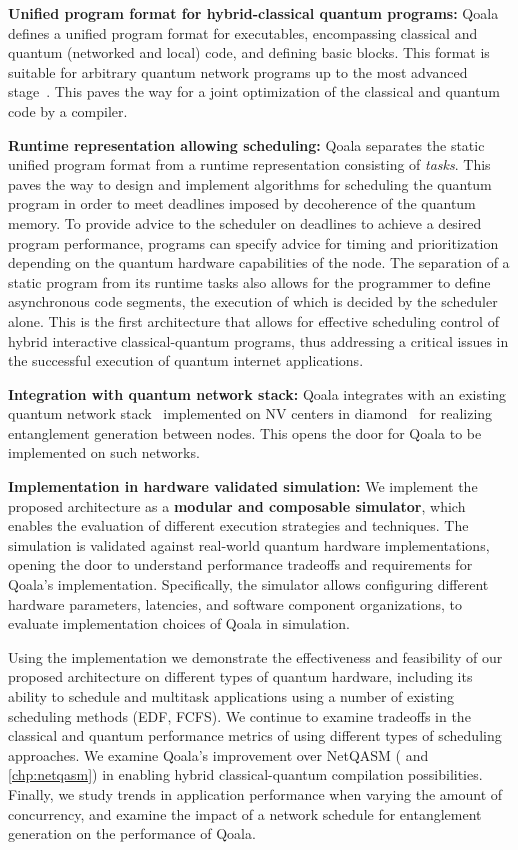\textbf{Unified program format for hybrid-classical quantum programs:}
Qoala defines a unified program format for executables, encompassing classical and quantum (networked and local) code, and defining basic blocks.
This format is suitable for arbitrary quantum network programs up to the most advanced stage~\cite{wehner2018quantum}.
This paves the way for a joint optimization of the classical and quantum code by a compiler.

\textbf{Runtime representation allowing scheduling:} Qoala separates the static unified program format from a runtime representation consisting of \textit{tasks}. 
This paves the way to design and implement algorithms for scheduling the quantum program in order to meet deadlines imposed by decoherence of the quantum memory.  
To provide advice to the scheduler on deadlines to achieve a desired program performance, programs can specify advice for timing and prioritization depending 
on the quantum hardware capabilities of the node. 
The separation of a static program from its runtime tasks also allows for the programmer to define asynchronous code segments, the execution of which is decided by the scheduler alone.
This is the first architecture that allows for effective scheduling control of hybrid interactive classical-quantum programs, thus addressing a critical issues in the successful execution of quantum internet applications.

\textbf{Integration with quantum network stack:}
Qoala integrates with an existing quantum network stack~\cite{dahlberg2019link} implemented on NV centers in diamond~\cite{pompili2022experimental} for realizing entanglement generation between nodes. This opens the door for Qoala to be implemented on such networks.

\textbf{Implementation in hardware validated simulation:} We implement the proposed architecture as a \textbf{modular and composable simulator}, which enables the evaluation of different execution strategies and techniques.
The simulation is validated against real-world quantum hardware implementations, opening the door to understand performance tradeoffs and requirements for Qoala's implementation. Specifically, the simulator allows 
configuring different hardware parameters, latencies, and software component organizations, to evaluate implementation choices of Qoala in simulation. 

Using the implementation we demonstrate the effectiveness and feasibility of our proposed architecture on different types of quantum hardware, including its ability to schedule and multitask applications using a number of existing scheduling methods (EDF, FCFS).
We continue to examine tradeoffs in the classical and quantum performance metrics of using different types of scheduling approaches. 
We examine Qoala's improvement over NetQASM (\cite{dahlberg2022netqasm} and \cref{chp:netqasm}) in enabling hybrid classical-quantum compilation possibilities. 
Finally, we study trends in application performance when varying the amount of concurrency, and examine the impact of a network schedule for entanglement generation on the performance of Qoala.

